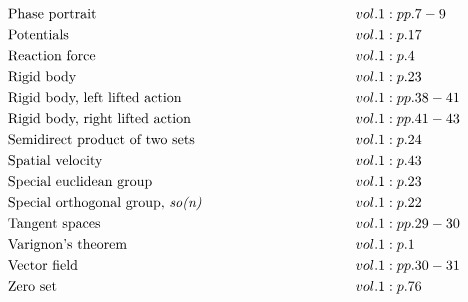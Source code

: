 \documentclass[a4paper]{article}
\begin{document}
\begin{align*}
&\text{Phase portrait} \hspace*{10em}&& vol. 1: pp. 7-9\\
&\text{Potentials} \hspace*{10em}&& vol. 1: p. 17\\
&\text{Reaction force} \hspace*{10em}&& vol. 1: p. 4\\
&\text{Rigid body} \hspace*{10em}&& vol. 1: p. 23\\
&\text{Rigid body, left lifted action} \hspace*{10em}&& vol. 1: pp. 38-41\\
&\text{Rigid body, right lifted action} \hspace*{10em}&& vol. 1: pp. 41-43\\
&\text{Semidirect product of two sets} \hspace*{10em}&& vol. 1: p. 24\\
&\text{Spatial velocity} \hspace*{10em}&& vol. 1: p. 43\\
&\text{Special euclidean group} \hspace*{10em}&& vol. 1: p. 23\\
&\text{Special orthogonal group, \emph{so(n)}} \hspace*{10em}&& vol. 1: p. 22\\
&\text{Tangent spaces} \hspace*{10em}&& vol. 1: pp. 29-30\\
&\text{Varignon's theorem} \hspace*{10em}&& vol. 1: p. 1\\
&\text{Vector field} \hspace*{10em}&& vol. 1: pp. 30-31\\
&\text{Zero set} \hspace*{10em}&& vol. 1: p. 76\\
\end{align*} 
\end{document}

